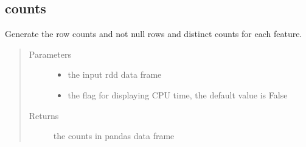 \documentclass[letterpaper,12pt,english]{sphinxmanual}
\begin{document}
\subsection{counts}
\label{\detokenize{basics:counts}}

\begin{fulllineitems}
Generate the row counts and not null rows and distinct counts for each feature.
\begin{quote}\begin{description}
\item[{Parameters}] \leavevmode\begin{itemize}
\item {} 
 \textendash{} the input rdd data frame

\item {} 
 \textendash{} the flag for displaying CPU time, the default value is False

\end{itemize}

\item[{Returns}] \leavevmode
the counts in pandas data frame

\end{description}\end{quote}


\end{fulllineitems}
\end{document}
